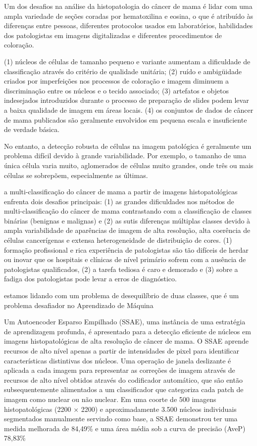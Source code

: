 \documentclass[preprint,12pt,authoryear]{elsarticle}
\begin{document}
\cite{VO2019} Um dos desafios na análise da histopatologia do câncer de mama é lidar com uma ampla variedade de seções coradas por hematoxilina e eosina, o que é atribuído às diferenças entre pessoas, diferentes protocolos usados em laboratórios, habilidades dos patologistas em imagens digitalizadas e diferentes procedimentos de coloração.

\cite{FENG2018} (1) núcleos de células de tamanho pequeno e variante aumentam a dificuldade de classificação através do critério de qualidade unitária; (2) ruído e ambigüidade criados por imperfeições nos processos de coloração e imagem diminuem a discriminação entre os núcleos e o tecido associado; (3) artefatos e objetos indesejados introduzidos durante o processo de preparação de slides podem levar a baixa qualidade de imagem em áreas locais. (4) os conjuntos de dados de câncer de mama publicados são geralmente envolvidos em pequena escala e insuficiente de verdade básica.

\cite{PAN2018} No entanto, a detecção robusta de células na imagem patológica é geralmente um problema difícil devido à grande variabilidade. Por exemplo, o tamanho de uma única célula varia muito, aglomerados de células muito grandes, onde três ou mais células se sobrepõem, especialmente as últimas.

 \cite{HAN2017} a multi-classificação do câncer de mama a partir de imagens histopatológicas enfrenta dois desafios principais: (1) as grandes dificuldades nos métodos de multi-classificação do câncer de mama contrastando com a classificação de classes binárias (benignas e malignas) e (2) as sutis diferenças múltiplas classes devido à ampla variabilidade de aparências de imagem de alta resolução, alta coerência de células cancerígenas e extensa heterogeneidade de distribuição de cores. (1) formação profissional e rica experiência de patologistas são tão difíceis de herdar ou inovar que os hospitais e clínicas de nível primário sofrem com a ausência de patologistas qualificados, (2) a tarefa tediosa é caro e demorado e (3) sobre a fadiga dos patologistas pode levar a erros de diagnóstico.

\cite{KRAWCZYK2016} estamos lidando com um problema de desequilíbrio de duas classes, que é um problema desafiador no Aprendizado de Máquina

\cite{XU2016} Um Autoencoder Esparso Empilhado (SSAE), uma instância de uma estratégia de aprendizagem profunda, é apresentado para a detecção eficiente de núcleos em imagens histopatológicas de alta resolução de câncer de mama. O SSAE aprende recursos de alto nível apenas a partir de intensidades de pixel para identificar características distintivas dos núcleos. Uma operação de janela deslizante é aplicada a cada imagem para representar as correções de imagem através de recursos de alto nível obtidos através do codificador automático, que são então subsequentemente alimentados a um classificador que categoriza cada patch de imagem como nuclear ou não nuclear. Em uma coorte de 500 imagens histopatológicas (2200 × 2200) e aproximadamente 3.500 núcleos individuais segmentados manualmente servindo como base, a SSAE demonstrou ter uma medida melhorada de 84,49\% e uma área média sob a curva de precisão (AveP) 78,83\% 
\end{document}
